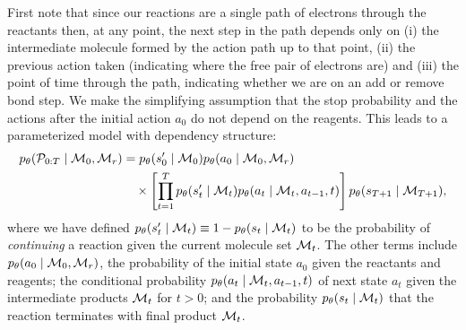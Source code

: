 First note that since our reactions are a single path of electrons through the reactants then, at any point, the next step in the path depends only on (i) the intermediate molecule formed by the action path up to that point, (ii) the previous action taken (indicating where the free pair of electrons are) and (iii) the point of time through the path, indicating whether we are on an add or remove bond step. 
We make the simplifying assumption that the stop probability and the actions after the initial action $a_0$ do not depend on the reagents. This leads to a parameterized model with dependency structure:
\begin{align}
\label{eq:jointprob}
p_\theta({\mathcal{P}}_{0:T} \mid {\mathcal{M}}_0, {\mathcal{M}}_r) 
&=
	p_\theta(s'_0 \mid {\mathcal{M}}_0)
	p_\theta(a_0 \mid {\mathcal{M}}_0, {\mathcal{M}}_r)\\ \nonumber &\quad \times
	\left[\prod_{t=1}^{T}
		p_\theta(s_{t}' \mid {\mathcal{M}}_{t})
		p_\theta(a_t \mid {\mathcal{M}}_{t}, a_{t-1}, t)
	\right]
	p_\theta(s_{T+1} \mid {\mathcal{M}}_{T+1})
	,
\end{align}
where we have defined $p_\theta(s'_t \mid {\mathcal{M}}_t) \equiv 1 - p_\theta(s_t \mid {\mathcal{M}}_t)$ to be the probability of {\em continuing} a reaction given the current molecule set ${\mathcal{M}}_t$.
The other terms include $p_\theta(a_0 \mid {\mathcal{M}}_0, {\mathcal{M}}_r)$, the probability of the initial state $a_0$ given the reactants and reagents; 
the conditional probability $p_\theta(a_t \mid  {\mathcal{M}}_t, a_{t-1}, t)$ 
of next state $a_t$ given the intermediate products ${\mathcal{M}}_t$ for $t > 0$;
and the probability $p_\theta(s_t \mid {\mathcal{M}}_t)$ that the reaction terminates with final product ${\mathcal{M}}_{t}$.


